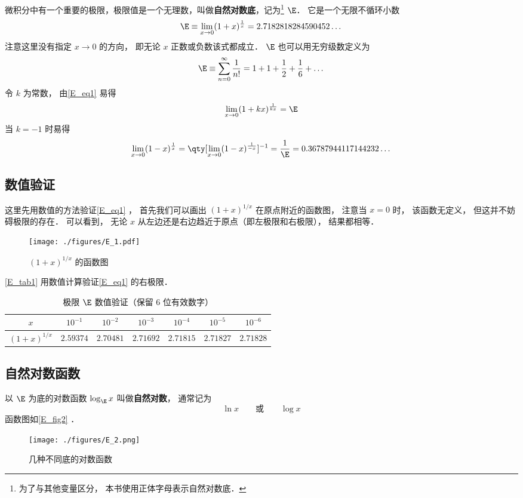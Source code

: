 
微积分中有一个重要的极限，极限值是一个无理数，叫做\textbf{自然对数底}，记为\footnote{为了与其他变量区分， 本书使用正体字母表示自然对数底．} $\E$． 它是一个无限不循环小数
\begin{equation}\label{E_eq1}
\E \equiv \lim_{x \to 0} (1 + x)^{\frac{1}{x}} = 2.7182818284590452\dots
\end{equation}
注意这里没有指定 $x\to 0$ 的方向， 即无论 $x$ 正数或负数该式都成立． $\E$ 也可以用无穷级数定义为
\begin{equation}\label{E_eq2}
\E \equiv \sum_{n=0}^\infty \frac{1}{n!} = 1 + 1 + \frac{1}{2} + \frac{1}{6} + \dots
\end{equation}
令 $k$ 为常数， 由\autoref{E_eq1} 易得
\begin{equation}
\lim_{x \to 0} (1 + kx)^{\frac{1}{kx}} = \E
\end{equation}
当 $k = -1$ 时易得
\begin{equation}
\lim_{x \to 0} (1 - x)^{\frac{1}{x}} = \qty[\lim_{x \to 0} (1 - x)^{\frac{1}{-x}}]^{-1} = \frac{1}{\E} = 0.36787944117144232\dots
\end{equation}

\subsection{数值验证}
这里先用数值的方法验证\autoref{E_eq1} ， 首先我们可以画出 $(1+x)^{1/x}$ 在原点附近的函数图， 注意当 $x = 0$ 时， 该函数无定义， 但这并不妨碍极限的存在． 可以看到， 无论 $x$ 从左边还是右边趋近于原点（即左极限和右极限）， 结果都相等．
\begin{figure}[ht]
\centering
\texttt{[image: ./figures/E\_1.pdf]}
\caption{$(1+x)^{1/x}$ 的函数图} \label{E_fig1}
\end{figure}

\autoref{E_tab1} 用数值计算验证\autoref{E_eq1} 的右极限．
\begin{table}[ht]
\centering
\caption{极限 $\E$ 数值验证（保留 6 位有效数字）}\label{E_tab1}
\begin{tabular}{|c|c|c|c|c|c|c|}
\hline
$x$ & $10^{-1}$ & $10^{-2}$ & $10^{-3}$ & $10^{-4}$ & $10^{-5}$ & $10^{-6}$ \\
\hline
$(1 + x)^{1/x}$ & $2.59374$ & $2.70481$ & $2.71692$ & $2.71815$ & $2.71827$ & $2.71828$ \\
\hline
\end{tabular}
\end{table}

\subsection{自然对数函数}
以 $\E$ 为底的对数函数 $\log_{\E} x$ 叫做\textbf{自然对数}， 通常记为
\begin{equation}
\ln x \qquad \text{或} \qquad \log x
\end{equation}
函数图如\autoref{E_fig2} ．
\begin{figure}[ht]
\centering
\texttt{[image: ./figures/E\_2.png]}
\caption{几种不同底的对数函数} \label{E_fig2}
\end{figure}
